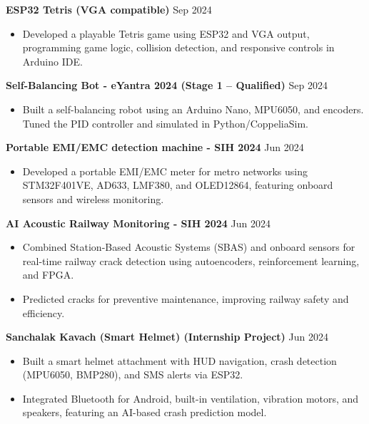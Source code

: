 \documentclass[10pt,a4paper]{article}%
\begin{document}
\noindent \textbf{ESP32 Tetris (VGA compatible)} \hfill Sep 2024%
\begin{itemize}[leftmargin=15pt, nosep, topsep=0pt]%
\item Developed a playable Tetris game using ESP32 and VGA output, programming game logic, collision detection, and responsive controls in Arduino IDE.%
\end{itemize} \vspace{8pt}%
\noindent \textbf{Self-Balancing Bot - eYantra 2024 (Stage 1 – Qualified)} \hfill Sep 2024%
\begin{itemize}[leftmargin=15pt, nosep, topsep=0pt]%
\item Built a self-balancing robot using an Arduino Nano, MPU6050, and encoders. Tuned the PID controller and simulated in Python/CoppeliaSim.%
\end{itemize} \vspace{8pt}%
\noindent \textbf{Portable EMI/EMC detection machine - SIH 2024} \hfill Jun 2024%
\begin{itemize}[leftmargin=15pt, nosep, topsep=0pt]%
\item Developed a portable EMI/EMC meter for metro networks using STM32F401VE, AD633, LMF380, and OLED12864, featuring onboard sensors and wireless monitoring.%
\end{itemize} \vspace{8pt}%
\newpage \noindent \textbf{AI Acoustic Railway Monitoring - SIH 2024} \hfill Jun 2024%
\begin{itemize}[leftmargin=15pt, nosep, topsep=0pt]%
\item Combined Station-Based Acoustic Systems (SBAS) and onboard sensors for real-time railway crack detection using autoencoders, reinforcement learning, and FPGA.%
\item Predicted cracks for preventive maintenance, improving railway safety and efficiency.%
\end{itemize} \vspace{8pt}%
\noindent \textbf{Sanchalak Kavach (Smart Helmet) (Internship Project)} \hfill Jun 2024%
\begin{itemize}[leftmargin=15pt, nosep, topsep=0pt]%
\item Built a smart helmet attachment with HUD navigation, crash detection (MPU6050, BMP280), and SMS alerts via ESP32.%
\item Integrated Bluetooth for Android, built-in ventilation, vibration motors, and speakers, featuring an AI-based crash prediction model.%
\end{itemize} \vspace{8pt}%
\end{document}
